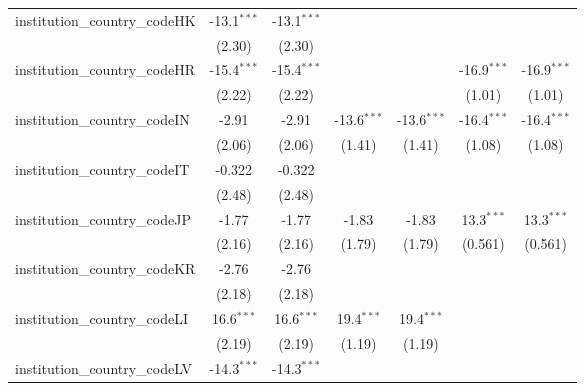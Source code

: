 \begin{tabular}{lcccccc}
   institution\_country\_codeHK          & -13.1$^{***}$ & -13.1$^{***}$ &               &               &               &   \\   
                                         & (2.30)        & (2.30)        &               &               &               &   \\   
   institution\_country\_codeHR          & -15.4$^{***}$ & -15.4$^{***}$ &               &               & -16.9$^{***}$ & -16.9$^{***}$\\   
                                         & (2.22)        & (2.22)        &               &               & (1.01)        & (1.01)\\   
   institution\_country\_codeIN          & -2.91         & -2.91         & -13.6$^{***}$ & -13.6$^{***}$ & -16.4$^{***}$ & -16.4$^{***}$\\   
                                         & (2.06)        & (2.06)        & (1.41)        & (1.41)        & (1.08)        & (1.08)\\   
   institution\_country\_codeIT          & -0.322        & -0.322        &               &               &               &   \\   
                                         & (2.48)        & (2.48)        &               &               &               &   \\   
   institution\_country\_codeJP          & -1.77         & -1.77         & -1.83         & -1.83         & 13.3$^{***}$  & 13.3$^{***}$\\   
                                         & (2.16)        & (2.16)        & (1.79)        & (1.79)        & (0.561)       & (0.561)\\   
   institution\_country\_codeKR          & -2.76         & -2.76         &               &               &               &   \\   
                                         & (2.18)        & (2.18)        &               &               &               &   \\   
   institution\_country\_codeLI          & 16.6$^{***}$  & 16.6$^{***}$  & 19.4$^{***}$  & 19.4$^{***}$  &               &   \\   
                                         & (2.19)        & (2.19)        & (1.19)        & (1.19)        &               &   \\   
   institution\_country\_codeLV          & -14.3$^{***}$ & -14.3$^{***}$ &               &               &               &   \\   

\end{tabular}

